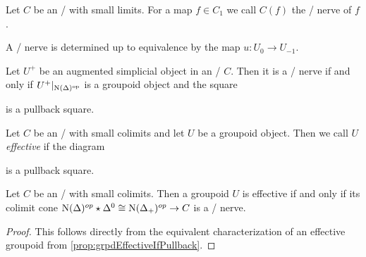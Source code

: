 \begin{definition}
    Let $C$ be an \inftycat/ with small limits. 
    For a map $f\in C_1$ we call $C(f)$ the \Cech/ nerve of $f$.
\end{definition}
\begin{lemma}
    A \Cech/ nerve is determined up to equivalence by the map $u\colon U_0\to U_{-1}$.
\end{lemma}
\begin{prop}\label{prop:grpdEffectiveIfPullback} %
    Let $U^+$ be an augmented simplicial object in an \inftycat/ $C$.
    Then it is a \Cech/ nerve if and only if $U^+|_{\operatorname{N}(\Delta)^{\operatorname{op}}}$ is a groupoid object and the square
    \begin{center}
    \end{center}
    is a pullback square.
\end{prop}
\begin{definition}
    Let $C$ be an \inftycat/ with small colimits and let $U$ be a groupoid object.
    Then we call $U$ \emph{effective} if the diagram 
    \begin{center}
    \end{center}
    is a pullback square.
\end{definition}
\begin{corollary}
    Let $C$ be an \inftycat/ with small colimits. 
    Then a groupoid $U$ is effective if and only if its colimit cone $\operatorname{N}(\Delta)^{op}\star\Delta^0\cong\operatorname{N}(\Delta_+)^{op}\to C$ is a \Cech/ nerve.
    \begin{proof}
        This follows directly from the equivalent characterization of an effective groupoid from \cref{prop:grpdEffectiveIfPullback}.
    \end{proof}
\end{corollary}
